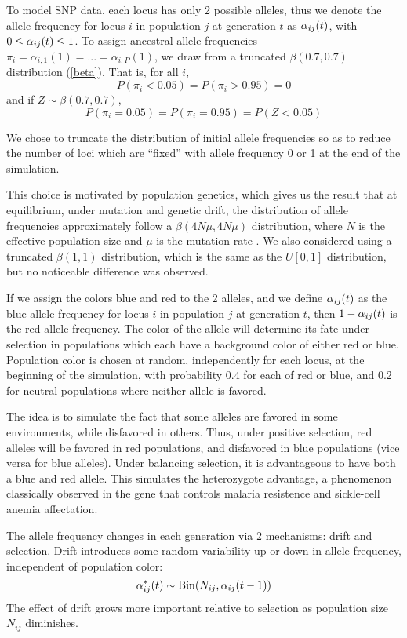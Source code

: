 \documentclass[a4paper,12pt]{article}
\begin{document}
To model SNP data, each locus has only 2 possible alleles, thus we
denote the allele frequency for locus $i$ in population $j$ at
generation $t$ as $\alpha_{ij}(t)$, with $0\leq \alpha_{ij}(t)\leq 1$. To assign ancestral
allele frequencies $\pi_i=\alpha_{i,1}(1)=...=\alpha_{i,P}(1)$, we
draw from a truncated $\beta(0.7,0.7)$ distribution
(\autoref{beta}). That is, for all $i$,
$$P(\pi_i<0.05)=P(\pi_i>0.95)=0$$
and if $Z\sim\beta(0.7,0.7)$,
$$P(\pi_i=0.05)=P(\pi_i=0.95)=P(Z<0.05)$$

We chose to truncate the distribution of initial allele frequencies so
as to reduce the number of loci which are ``fixed'' with allele
frequency 0 or 1 at the end of the simulation.

This choice is motivated by population genetics, which gives us the
result that at equilibrium, under mutation and genetic drift, the
distribution of allele frequencies approximately follow a
$\beta(4N\mu,4N\mu)$ distribution, where $N$ is the effective
population size and $\mu$ is the mutation rate \cite{Wright}. We
also considered using a truncated $\beta(1,1)$ distribution, which is
the same as the $U[0,1]$ distribution, but no noticeable difference
was observed.


If we assign the colors blue and red to the 2 alleles, and we define
$\alpha_{ij}(t)$ as the blue allele frequency for locus $i$ in population $j$ at
generation $t$, then $1-\alpha_{ij}(t)$ is the red allele frequency. The color
of the allele will determine its fate under selection in populations
which each have a background color of either red or blue. Population
color is chosen at random, independently for each locus, at the
beginning of the simulation, with probability 0.4 for each of red or
blue, and 0.2 for neutral populations where neither allele is favored.

The idea is to simulate the fact that some alleles are favored in some
environments, while disfavored in others. Thus, under positive
selection, red alleles will be favored in red populations, and
disfavored in blue populations (vice versa for blue alleles). Under
balancing selection, it is advantageous to have both a blue and red
allele. This simulates the heterozygote advantage, a phenomenon
classically observed in the gene that controls malaria resistence and
sickle-cell anemia affectation.

The allele frequency changes in each generation via
2 mechanisms: drift and selection. Drift introduces some random
variability up or down in allele frequency, independent of population
color:
$$\alpha_{ij}^*(t) \sim \operatorname{Bin}(N_{ij},\alpha_{ij}(t-1))$$
The effect of drift grows more important relative to selection as
population size $N_{ij}$ diminishes.
\end{document}
